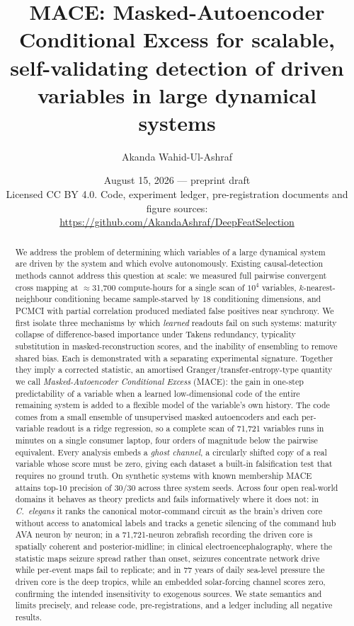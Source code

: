 \documentclass[11pt]{article}
\title{MACE: Masked-Autoencoder Conditional Excess for scalable,
self-validating detection of driven variables in large dynamical systems}
\author{Akanda Wahid-Ul-Ashraf}
\date{August 15, 2026 --- preprint draft \\[2pt]
{\normalsize Licensed CC BY 4.0. Code, experiment ledger, pre-registration
documents and figure sources:\\
\url{https://github.com/AkandaAshraf/DeepFeatSelection}}}
\begin{document}
\maketitle

\begin{abstract}
We address the problem of determining which variables of a large dynamical
system are driven by the system and which evolve autonomously. Existing
causal-detection methods cannot address this question at scale: we measured
full pairwise convergent cross mapping at $\approx$31{,}700 compute-hours
for a single scan of $10^4$ variables, $k$-nearest-neighbour conditioning
became sample-starved by 18 conditioning dimensions, and PCMCI with partial
correlation produced mediated false positives near synchrony. We first
isolate three mechanisms by which \emph{learned} readouts fail on such
systems: maturity collapse of difference-based importance under Takens
redundancy, typicality substitution in masked-reconstruction scores, and the
inability of ensembling to remove shared bias. Each is demonstrated with a
separating experimental signature. Together they imply a corrected
statistic, an amortised Granger/transfer-entropy-type quantity we call
\emph{Masked-Autoencoder Conditional Excess} (MACE): the gain in one-step
predictability of a variable when a learned low-dimensional code of the
entire remaining system is added to a flexible model of the variable's own
history. The code comes from a small ensemble of unsupervised masked
autoencoders and each per-variable readout is a ridge regression, so a
complete scan of 71{,}721 variables runs in minutes on a single consumer
laptop, four orders of magnitude below the pairwise equivalent. Every
analysis embeds a \emph{ghost channel}, a circularly shifted copy of a real
variable whose score must be zero, giving each dataset a built-in
falsification test that requires no ground truth. On synthetic systems with
known membership MACE attains top-10 precision of 30/30 across three system
seeds. Across four open real-world domains it behaves as theory predicts and
fails informatively where it does not: in \emph{C.~elegans} it ranks the
canonical motor-command circuit as the brain's driven core without access to
anatomical labels and tracks a genetic silencing of the command hub AVA
neuron by neuron; in a 71{,}721-neuron zebrafish recording the driven core is
spatially coherent and posterior-midline; in clinical electroencephalography,
where the statistic maps seizure spread rather than onset, seizures
concentrate network drive while per-event maps fail to replicate; and in 77
years of daily sea-level pressure the driven core is the deep tropics, while
an embedded solar-forcing channel scores zero, confirming the intended
insensitivity to exogenous sources. We state semantics and limits precisely,
and release code, pre-registrations, and a ledger including all negative
results.
\end{abstract}
\end{document}
